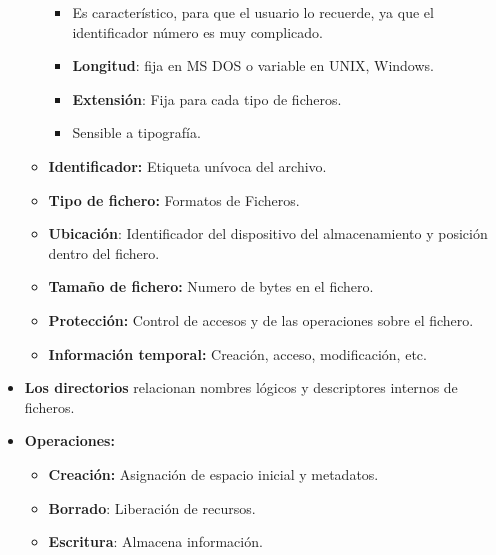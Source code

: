 \documentclass[12pt, twoside, openright]{report} %
\begin{document}
\begin{itemize}
\begin{itemize}
      \begin{itemize}
      \item Es característico, para que el usuario lo recuerde, ya que el
        identificador número es muy complicado.
        
      \item \textbf{Longitud}: fija en MS DOS o variable en UNIX, Windows.
        
      \item \textbf{Extensión}: Fija para cada tipo de ficheros.
        
      \item Sensible a tipografía.
        
      \end{itemize}
    \item \textbf{Identificador:} Etiqueta unívoca del archivo.
      
    \item \textbf{Tipo de fichero:} Formatos de Ficheros.
      
    \item \textbf{Ubicación}: Identificador del dispositivo del
      almacenamiento y posición dentro del fichero.
      
    \item \textbf{Tamaño de fichero:} Numero de bytes en el fichero.
      
    \item \textbf{Protección:} Control de accesos y de las operaciones sobre
      el fichero.
      
    \item \textbf{Información temporal:} Creación, acceso, modificación,
      etc.
      
    \end{itemize}
  \item \textbf{Los directorios} relacionan nombres lógicos y descriptores
    internos de ficheros.
    
  \item \textbf{Operaciones:}
    

    \begin{itemize}
    \item \textbf{Creación:} Asignación de espacio inicial y metadatos.
      
    \item \textbf{Borrado}: Liberación de recursos.
      
    \item \textbf{Escritura}: Almacena información.
      

\end{itemize}
\end{itemize}
\end{document}
